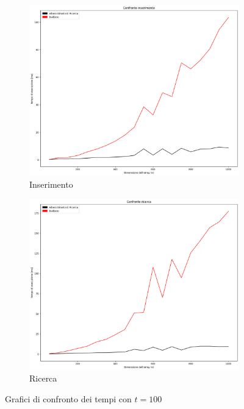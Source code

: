 \begin{figure}[H]
    \centering
    \begin{subfigure}[b]{0.49\textwidth}
        \centering
        \includegraphics[width=\textwidth]{comparison-graphs/insert-ms-t100.png}
        \caption{Inserimento}
        \label{fig:compgraphinserttimet100}
    \end{subfigure}
    \hfill
    \begin{subfigure}[b]{0.49\textwidth}
        \centering
        \includegraphics[width=\textwidth]{comparison-graphs/search-ms-t100.png}
        \caption{Ricerca}
        \label{fig:compgraphsearchtimet100}
    \end{subfigure}
    \caption{Grafici di confronto dei tempi con $t=100$}
    \label{fig:compgraphtimest100}
\end{figure}

